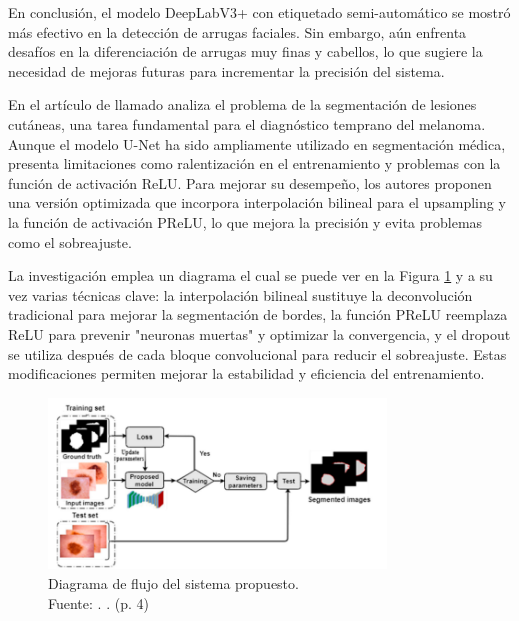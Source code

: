 En conclusión, el modelo DeepLabV3+ con etiquetado semi-automático se mostró más efectivo en la detección de arrugas faciales. Sin embargo, aún enfrenta desafíos en la diferenciación de arrugas muy finas y cabellos, lo que sugiere la necesidad de mejoras futuras para incrementar la precisión del sistema.



En el artículo de \cite{karshiev2020improved} llamado  analiza el problema de la segmentación de lesiones cutáneas, una tarea fundamental para el diagnóstico temprano del melanoma. Aunque el modelo U-Net ha sido ampliamente utilizado en segmentación médica, presenta limitaciones como ralentización en el entrenamiento y problemas con la función de activación ReLU. Para mejorar su desempeño, los autores proponen una versión optimizada que incorpora interpolación bilineal para el upsampling y la función de activación PReLU, lo que mejora la precisión y evita problemas como el sobreajuste.

La investigación emplea un diagrama el cual se puede ver en la Figura \ref{2:fig5} y a su vez varias técnicas clave: la interpolación bilineal sustituye la deconvolución tradicional para mejorar la segmentación de bordes, la función PReLU reemplaza ReLU para prevenir "neuronas muertas" y optimizar la convergencia, y el dropout se utiliza después de cada bloque convolucional para reducir el sobreajuste. Estas modificaciones permiten mejorar la estabilidad y eficiencia del entrenamiento.

\begin{figure}[!ht]
	\begin{center}
		\includegraphics[width=0.80\textwidth]{2/figures/flowchart.png}
		\caption[Diagrama de flujo del sistema propuesto]{Diagrama de flujo del sistema propuesto.\\
			Fuente: \cite{karshiev2020improved}. . (p. 4)}
		\label{2:fig5}
	\end{center}
\end{figure}

